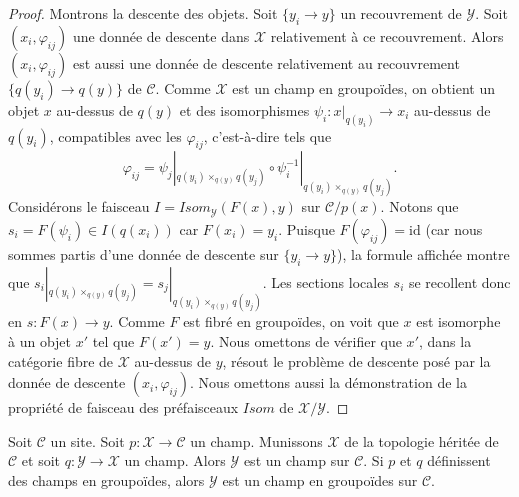 \begin{proof}
Montrons la descente des objets. Soit $\{y_i \to y\}$ un recouvrement
de $\mathcal{Y}$. Soit $(x_i, \varphi_{ij})$ une donnée de descente dans
$\mathcal{X}$ relativement à ce recouvrement. Alors $(x_i, \varphi_{ij})$ est aussi une donnée
de descente relativement au recouvrement $\{q(y_i) \to q(y)\}$ de
$\mathcal{C}$. Comme $\mathcal{X}$ est un champ en groupoïdes, on obtient un
objet $x$ au-dessus de $q(y)$ et des isomorphismes
$\psi_i : x|_{q(y_i)} \to x_i$
au-dessus de $q(y_i)$, compatibles avec les $\varphi_{ij}$, c'est-à-dire tels que
$$
\varphi_{ij} = \psi_j|_{q(y_i) \times_{q(y)} q(y_j)}
\circ \psi_i^{-1}|_{q(y_i) \times_{q(y)} q(y_j)}.
$$
Considérons le faisceau $\mathit{I} = \mathit{Isom}_\mathcal{Y}(F(x), y)$
sur $\mathcal{C}/p(x)$. Notons que $s_i = F(\psi_i) \in \mathit{I}(q(x_i))$
car $F(x_i) = y_i$. Puisque $F(\varphi_{ij}) = \text{id}$ (car nous sommes partis
d'une donnée de descente sur $\{y_i \to y\}$), la formule affichée montre
que $s_i|_{q(y_i) \times_{q(y)} q(y_j)} = s_j|_{q(y_i) \times_{q(y)} q(y_j)}$.
Les sections locales $s_i$ se recollent donc en $s : F(x) \to y$. Comme $F$ est fibré en
groupoïdes, on voit que $x$ est isomorphe à un objet $x'$ tel que $F(x') = y$.
Nous omettons de vérifier que $x'$, dans la catégorie fibre de $\mathcal{X}$
au-dessus de $y$, résout le problème de descente posé par la donnée de descente
$(x_i, \varphi_{ij})$. Nous omettons aussi la démonstration de la propriété de faisceau
des préfaisceaux $\mathit{Isom}$ de $\mathcal{X}/\mathcal{Y}$.
\end{proof}

\begin{lemma}
\label{lemma-stack-over-stack}
Soit $\mathcal{C}$ un site. Soit $p : \mathcal{X} \to \mathcal{C}$
un champ. Munissons $\mathcal{X}$ de la topologie héritée de
$\mathcal{C}$ et soit $q : \mathcal{Y} \to \mathcal{X}$ un champ.
Alors $\mathcal{Y}$ est un champ sur $\mathcal{C}$.
Si $p$ et $q$ définissent des champs en groupoïdes, alors
$\mathcal{Y}$ est un champ en groupoïdes sur $\mathcal{C}$.
\end{lemma}

